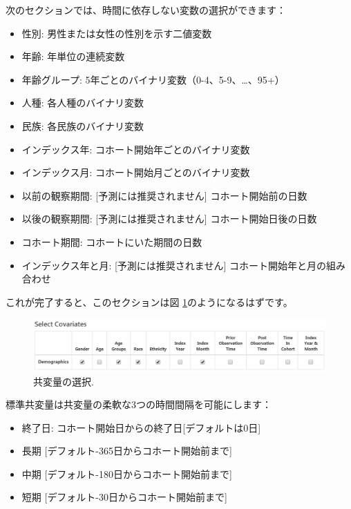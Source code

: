 \documentclass[
  11pt]{book}
\providecommand{\tightlist}{%
  \setlength{\itemsep}{0pt}\setlength{\parskip}{0pt}}
\theoremstyle{definition}
\theoremstyle{definition}
\theoremstyle{definition}
\theoremstyle{definition}
\theoremstyle{remark}
\begin{document}
次のセクションでは、時間に依存しない変数の選択ができます：

\begin{itemize}
\tightlist
\item
  性別: 男性または女性の性別を示す二値変数
\item
  年齢: 年単位の連続変数
\item
  年齢グループ: 5年ごとのバイナリ変数（0-4、5-9、\ldots、95+）
\item
  人種: 各人種のバイナリ変数
\item
  民族: 各民族のバイナリ変数
\item
  インデックス年: コホート開始年ごとのバイナリ変数
\item
  インデックス月: コホート開始月ごとのバイナリ変数
\item
  以前の観察期間: {[}予測には推奨されません{]} コホート開始前の日数
\item
  以後の観察期間: {[}予測には推奨されません{]} コホート開始日後の日数
\item
  コホート期間: コホートにいた期間の日数
\item
  インデックス年と月: {[}予測には推奨されません{]} コホート開始年と月の組み合わせ
\end{itemize}

これが完了すると、このセクションは図 \ref{fig:covariateSettings2}のようになるはずです。

\begin{figure}

{\centering \includegraphics[width=1\linewidth]{images/PatientLevelPrediction/covariateSettings2} 

}

\caption{共変量の選択.}\label{fig:covariateSettings2}
\end{figure}

標準共変量は共変量の柔軟な3つの時間間隔を可能にします：

\begin{itemize}
\tightlist
\item
  終了日: コホート開始日からの終了日{[}デフォルトは0日{]}
\item
  長期 {[}デフォルト-365日からコホート開始前まで{]}
\item
  中期 {[}デフォルト-180日からコホート開始前まで{]}
\item
  短期 {[}デフォルト-30日からコホート開始前まで{]}
\end{itemize}
\end{document}
